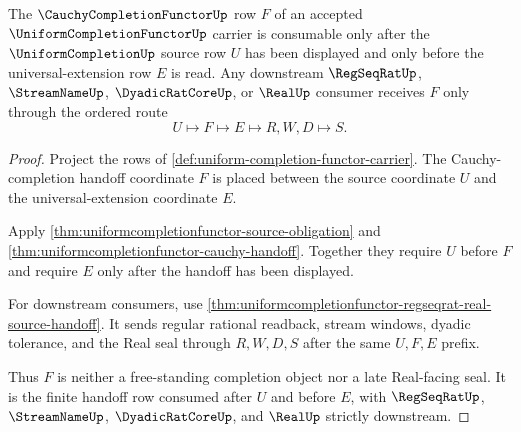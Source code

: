 \begin{theorem}
\label{thm:uniform-completion-functor-cauchy-completion-handoff}
The $\CauchyCompletionFunctorUp$ row $F$ of an accepted $\UniformCompletionFunctorUp$ carrier is consumable only after the $\UniformCompletionUp$ source row $U$ has been displayed and only before the universal-extension row $E$ is read. Any downstream $\RegSeqRatUp$, $\StreamNameUp$, $\DyadicRatCoreUp$, or $\RealUp$ consumer receives $F$ only through the ordered route
$$
U \longmapsto F \longmapsto E \longmapsto R,W,D \longmapsto S .
$$
\end{theorem}
\begin{proof}
Project the rows of \autoref{def:uniform-completion-functor-carrier}. The Cauchy-completion handoff coordinate $F$ is placed between the source coordinate $U$ and the universal-extension coordinate $E$.

Apply \autoref{thm:uniformcompletionfunctor-source-obligation} and \autoref{thm:uniformcompletionfunctor-cauchy-handoff}. Together they require $U$ before $F$ and require $E$ only after the handoff has been displayed.

For downstream consumers, use \autoref{thm:uniformcompletionfunctor-regseqrat-real-source-handoff}. It sends regular rational readback, stream windows, dyadic tolerance, and the Real seal through $R,W,D,S$ after the same $U,F,E$ prefix.

Thus $F$ is neither a free-standing completion object nor a late Real-facing seal. It is the finite handoff row consumed after $U$ and before $E$, with $\RegSeqRatUp$, $\StreamNameUp$, $\DyadicRatCoreUp$, and $\RealUp$ strictly downstream.
\end{proof}

